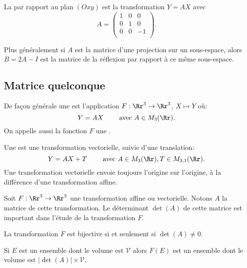 \documentclass[11pt,class=report,crop=false]{standalone}
\begin{document}

La  par rapport au plan $(Oxy)$ est la transformation $Y=AX$ avec
$$A = 
\begin{pmatrix}
	1 & 0 & 0 \\
	0 & 1 & 0 \\
	0 & 0 & -1 \\
\end{pmatrix}.$$


Plus généralement si $A$ est la matrice d'une projection sur un sous-espace, alors $B=2A-I$ est la matrice de la réflexion par rapport à ce même sous-espace.




\subsection{Matrice quelconque}

De façon générale une  est l'application $F : \Rr^3 \to \Rr^3$, $X \mapsto Y$ où:
$$Y =AX \qquad \text{ avec } A \in M_3(\Rr).$$
On appelle aussi la fonction $F$ une .


Une  est une transformation vectorielle, suivie d'une translation:
$$Y =AX + T \qquad \text{ avec } A \in M_3(\Rr), T \in M_{3,1}(\Rr).$$
Une transformation vectorielle envoie toujours l'origine sur l'origine, à la différence d'une transformation affine.


Soit $F : \Rr^3 \to \Rr^3$ une transformation affine ou vectorielle.
Notons $A$ la matrice de cette transformation.
Le déterminant $\det(A)$ de cette matrice est important dans l'étude de la transformation $F$.


\begin{proposition}
La transformation $F$ est bijective si et seulement si $\det(A) \neq 0$.
\end{proposition}

\begin{proposition}
Si $E$ est un ensemble dont le volume est $\mathcal{V}$ alors $F(E)$ est un ensemble dont le volume est $|\det(A)| \times \mathcal{V}$.
\end{proposition}
\end{document}
